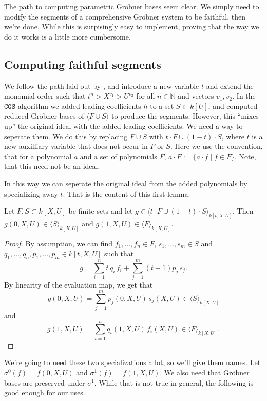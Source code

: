 \documentclass[a4paper, 12pt]{article}
\newcommand{\N}{\mathbb{N}}
\theoremstyle{changedot}
\theoremstyle{changedotbreak}
\theoremstyle{nonumberplain}
\newtheorem{proof}{Proof}
\begin{document}
The path to computing parametric Gröbner bases seem clear. We simply need to modify the segments of a comprehensive Gröbner system to be faithful, then we're done. While this is surpisingly easy to implement, proving that the way we do it works is a little more cumbersome.

\subsection{Computing faithful segments}

We follow the path laid out by \cite{ss_algo}, and introduce a new variable $t$ and extend the monomial order such that $t^{n} > X^{v_{1}} > U^{v_{2}}$ for all $n \in \N$ and vectors $v_{1}, v_{2}$. In the $\mathtt{CGS}$ algorithm we added leading coefficients $h$ to a set $S \subset k[U]$, and computed reduced Gröbner bases of $\langle F \cup S \rangle$ to produce the segments. However, this ``mixes up'' the original ideal with the added leading coefficients. We need a way to seperate them. We do this by replacing $F \cup S$ with $t\cdot F \cup (1-t)\cdot S$, where $t$ is a new auxilliary variable that does not occur in $F$ or $S$. Here we use the convention, that for a polynomial $a$ and a set of polynomials $F$, $a\cdot F := \{a \cdot f \mid f \in F\}$. Note, that this need not be an ideal.

In this way we can seperate the original ideal from the added polynomials by specializing away $t$. That is the content of this first lemma.

\begin{lemma}\label{lem:seperation}
  Let $F, S \subset k[X, U]$ be finite sets and let $g \in \langle t\cdot F \cup (1-t)\cdot S \rangle_{k[t, X, U]}$. Then $g(0, X, U) \in \langle S \rangle_{k[X, U]}$ and $g(1, X, U) \in \langle F \rangle_{k[X, U]}$.
\end{lemma}
\begin{proof}
  By assumption, we can find $f_{1}, \dots, f_{n} \in F$, $s_{1}, \dots, s_{m} \in S$ and $q_{1}, \dots, q_{n}, p_{1}, \dots, p_{m} \in k[t, X, U]$ such that
  \[g = \sum_{i=1}^{n} t\, q_{i}\, f_{i} + \sum_{j=1}^{m} (t-1) p_{j}\, s_{j}.\]
  By linearity of the evaluation map, we get that
  \[g(0, X, U) = \sum_{j=1}^{m} p_{j}(0, X, U)\, s_{j}(X, U) \in \langle S \rangle_{k[X, U]}\]
  and
  \[g(1, X, U) = \sum_{i=1}^{n} q_{i}(1, X, U)\, f_{i}(X, U) \in \langle F \rangle_{k[X, U]}.\]
\end{proof}

We're going to need these two specializations a lot, so we'll give them names. Let $\sigma^{0}(f) = f(0, X, U)$ and $\sigma^{1}(f) = f(1, X, U)$. We also need that Gröbner bases are preserved under $\sigma^{1}$. While that is not true in general, the following is good enough for our uses.
\end{document}
